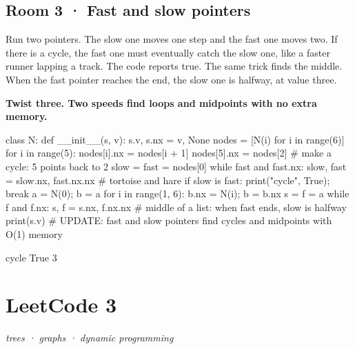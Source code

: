 \documentclass[11pt,a4paper]{report}
\begin{document}
\section*{Room 3 · Fast and slow pointers}
Run two pointers. The slow one moves one step and the fast one moves two. If there is a cycle, the fast one must eventually catch the slow one, like a faster runner lapping a track. The code reports true. The same trick finds the middle. When the fast pointer reaches the end, the slow one is halfway, at value three.
\begin{tcolorbox}[colback=yellow!12,colframe=orange!70!black,boxrule=0.4pt,left=4pt,right=4pt,top=2pt,bottom=2pt]\textbf{Twist three. Two speeds find loops and midpoints with no extra memory.}\end{tcolorbox}
\begin{Code}
class N:
    def __init__(s, v): s.v, s.nx = v, None
nodes = [N(i) for i in range(6)]
for i in range(5): nodes[i].nx = nodes[i + 1]
nodes[5].nx = nodes[2]                      # make a cycle: 5 points back to 2
slow = fast = nodes[0]
while fast and fast.nx:
    slow, fast = slow.nx, fast.nx.nx        # tortoise and hare
    if slow is fast: print("cycle", True); break
a = N(0); b = a
for i in range(1, 6): b.nx = N(i); b = b.nx
s = f = a
while f and f.nx: s, f = s.nx, f.nx.nx      # middle of a list: when fast ends, slow is halfway
print(s.v)
# UPDATE: fast and slow pointers find cycles and midpoints with O(1) memory
\end{Code}
\begin{Out}
cycle True
3
\end{Out}
\chapter{LeetCode 3}
\textit{trees · graphs · dynamic programming}
\end{document}

